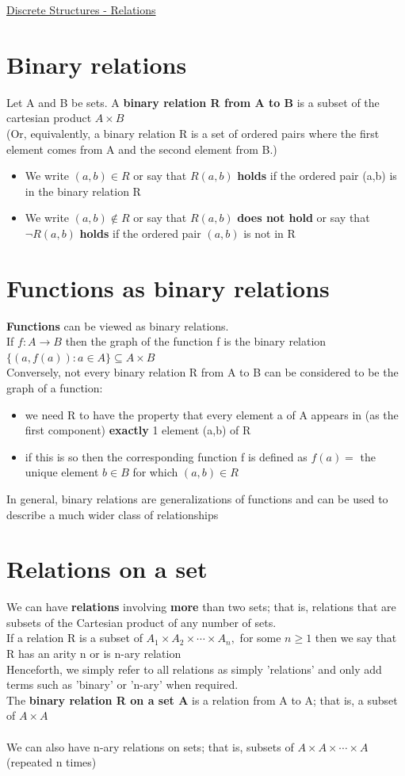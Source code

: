 \documentclass{article}[18pt]
\begin{document}
\begin{center}
\underline{\huge Discrete Structures - Relations}
\end{center}
\section{Binary relations}
Let A and B be sets. A \textbf{binary relation R from A to B} is a subset of the cartesian product $A\times B$\\
(Or, equivalently, a binary relation R is a set of ordered pairs
where the first element comes from A and the second element
from B.)
\begin{itemize}
	\item We write $(a,b)\in R$ or say that $R(a,b)$ \textbf{holds} if the ordered pair (a,b) is in the binary relation R
	\item We write $(a,b)\notin R$ or say that $R(a,b)$ \textbf{does not hold} or say that $\lnot R(a,b)$ \textbf{holds} if the ordered pair $(a,b)$ is not in R
\end{itemize}
\section{Functions as binary relations}
\textbf{Functions} can be viewed as binary relations.\\
If $f:A\rightarrow B$ then the graph of the function f is the binary relation $\{ ( a , f ( a ) ) : a \in A \} \subseteq A \times B$\\
Conversely, not every binary relation R from A to B can be considered to be the graph of a function:
\begin{itemize}
	\item we need R to have the property that every element a of A appears in (as the first component) \textbf{exactly} 1 element (a,b) of R
	\item if this is so then the corresponding function f is defined as $f(a)=$ the unique element $b\in B$ for which $(a,b)\in R$
\end{itemize}
In general, binary relations are generalizations of functions and can be used to describe a much wider class of relationships
\section{Relations on a set}
We can have \textbf{relations} involving \textbf{more} than two sets; that is, relations that are subsets of the Cartesian product of any number of sets.\\
If a relation R is a subset of $A _ { 1 } \times A _ { 2 } \times \cdots \times A _ { n } ,$ for some $n \geq 1$ then we say that R has an arity n or is n-ary relation\\
Henceforth, we simply refer to all relations as simply 'relations' and only add terms such as 'binary' or 'n-ary' when required.\\
The \textbf{binary relation R on a set A} is a relation from A to A; that is, a subset of $A\times A$\\
\\
We can also have n-ary relations on sets; that is, subsets of $A\times A\times \cdots \times A$ (repeated n times)
\end{document}
